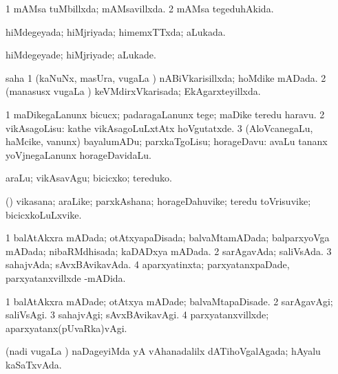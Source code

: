 {\bentry
{} 
\gl{\gu}
\expl{}
\bmng
\bnum
\num{1} mAMsa tuMbillxda; mAMsavillxda. 
\num{2} mAMsa tegeduhAkida. 
\enum
\emng
\eentry

\bentry
{} 
\gl{\gu}
\expl{}
\bmng
 hiMdegeyada; hiMjriyada; himemxTTxda; aLukada. 
\emng
\eentry

\bentry
{} 
\gl{\kirxvi}
\expl{}
\bmng
 hiMdegeyade; hiMjriyade; aLukade. 
\emng
\eentry

\bentry
{} 
\gl{\gu}
\expl{}
\bmng
  saha
\bnum
\num{1} (kaNuNx, masUra, \mo vugaLa \vi) nABiVkarisillxda; hoMdike mADada. 
\num{2} (manasusx \mo vugaLa \vi) keVMdirxVkarisada; EkAgarxteyillxda. 
\enum
\emng
\eentry

\bentry
{} 
\gl{\sakirx}
\expl{}
\bmng
\bnum
\num{1} maDikegaLanunx bicucx; padaragaLanunx tege; maDike teredu haravu. 
\num{2} vikAsagoLisu:  kathe vikAsagoLuLxtAtx hoVgutatxde. 
\num{3} (AloVcanegaLu, haMcike, \mo vanunx) bayalumADu; parxkaTgoLisu; horageDavu:  avaLu tananx yoVjnegaLanunx horageDavidaLu. 
\enum
\emng

\noindent 
\gl{\akirx}
\expl{}
\bmng
araLu; vikAsavAgu; bicicxko; tereduko. 
\emng
\eentry

\bentry
{} 
\gl{\nA}
\expl{}
\bmng
 (\ame) vikasana; araLike; parxkAshana; horageDahuvike; teredu toVrisuvike; bicicxkoLuLxvike. 
\emng
\eentry

\bentry
{} 
\gl{\gu}
\expl{}
\bmng
\bnum
\num{1} balAtAkxra mADada; otAtxyapaDisada; balvaMtamADada; balparxyoVga mADada; nibaRMdhisada; kaDADxya mADada. 
\num{2} sarAgavAda; saliVsAda. 
\num{3} sahajvAda; sAvxBAvikavAda. 
\num{4} aparxyatinxta; parxyatanxpaDade, parxyatanxvillxde -mADida. 
\enum
\emng
\eentry

\bentry
{} 
\gl{\kirxvi}
\expl{}
\bmng
\bnum
\num{1} balAtAkxra mADade; otAtxya mADade; balvaMtapaDisade. 
\num{2} sarAgavAgi; saliVsAgi. 
\num{3} sahajvAgi; sAvxBAvikavAgi. 
\num{4} parxyatanxvillxde; aparxyatanx(pUvaRka)vAgi. 
\enum
\emng
\eentry

\bentry
{} 
\gl{\gu}
\expl{}
\bmng
 (nadi \mo vugaLa \vi) naDageyiMda yA vAhanadalilx dATihoVgalAgada; hAyalu kaSaTxvAda. 
\emng
\eentry

}
